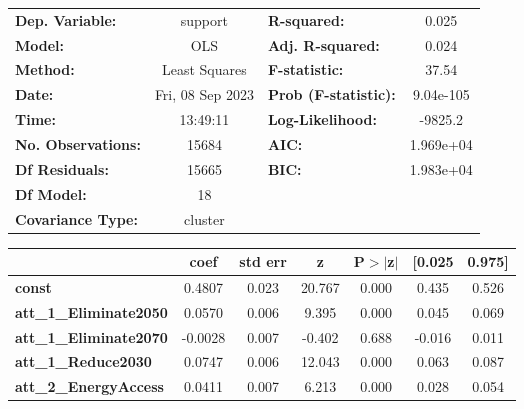 \begin{center}
\begin{tabular}{lclc}
\toprule
\textbf{Dep. Variable:}              &     support      & \textbf{  R-squared:         } &     0.025   \\
\textbf{Model:}                      &       OLS        & \textbf{  Adj. R-squared:    } &     0.024   \\
\textbf{Method:}                     &  Least Squares   & \textbf{  F-statistic:       } &     37.54   \\
\textbf{Date:}                       & Fri, 08 Sep 2023 & \textbf{  Prob (F-statistic):} & 9.04e-105   \\
\textbf{Time:}                       &     13:49:11     & \textbf{  Log-Likelihood:    } &   -9825.2   \\
\textbf{No. Observations:}           &       15684      & \textbf{  AIC:               } & 1.969e+04   \\
\textbf{Df Residuals:}               &       15665      & \textbf{  BIC:               } & 1.983e+04   \\
\textbf{Df Model:}                   &          18      & \textbf{                     } &             \\
\textbf{Covariance Type:}            &     cluster      & \textbf{                     } &             \\
\bottomrule
\end{tabular}
\begin{tabular}{lcccccc}
                                     & \textbf{coef} & \textbf{std err} & \textbf{z} & \textbf{P$> |$z$|$} & \textbf{[0.025} & \textbf{0.975]}  \\
\midrule
\textbf{const}                       &       0.4807  &        0.023     &    20.767  &         0.000        &        0.435    &        0.526     \\
\textbf{att\_1\_Eliminate2050}       &       0.0570  &        0.006     &     9.395  &         0.000        &        0.045    &        0.069     \\
\textbf{att\_1\_Eliminate2070}       &      -0.0028  &        0.007     &    -0.402  &         0.688        &       -0.016    &        0.011     \\
\textbf{att\_1\_Reduce2030}          &       0.0747  &        0.006     &    12.043  &         0.000        &        0.063    &        0.087     \\
\textbf{att\_2\_EnergyAccess}        &       0.0411  &        0.007     &     6.213  &         0.000        &        0.028    &        0.054     \\

\end{tabular}
\end{center}
